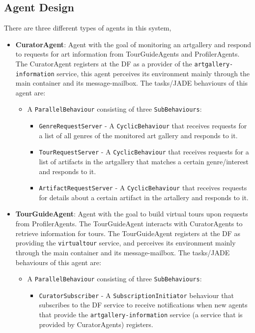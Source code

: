\documentclass[a4paper, 11pt]{article}
\begin{document}
\subsection*{Agent Design}
There are three different types of agents in this system,
\begin{itemize}
\item \textbf{CuratorAgent}: Agent with the goal of monitoring an artgallery and respond to requests for art information from TourGuideAgents and ProfilerAgents. The CuratorAgent registers at the DF as a provider of the \texttt{artgallery-information} service, this agent perceives its environment mainly through the main container and its message-mailbox. The tasks/JADE behaviours of this agent are:
\begin{itemize}
\item A \texttt{ParallelBehaviour} consisting of three \texttt{SubBehaviours}:
\begin{itemize}
\item \texttt{GenreRequestServer} - A \texttt{CyclicBehaviour} that receives requests for a list of all genres of the monitored art gallery and responds to it.
\item \texttt{TourRequestServer} - A \texttt{CyclicBehaviour} that receives requests for a list of artifacts in the artgallery that matches a certain genre/interest and responds to it.
\item \texttt{ArtifactRequestServer} - A \texttt{CyclicBehaviour} that receives requests for details about a certain artifact in the artallery and responds to it.
\end{itemize}
\end{itemize}
\item \textbf{TourGuideAgent}: Agent with the goal to build virtual tours upon requests from ProfilerAgents. The TourGuideAgent interacts with CuratorAgents to retrieve information for tours. The TourGuideAgent registers at the DF as providing the \texttt{virtualtour} service, and perceives its environment mainly through the main container and its message-mailbox. The tasks/JADE behaviours of this agent are:
\begin{itemize}
\item A \texttt{ParallelBehaviour} consisting of three \texttt{SubBehaviours}:
\begin{itemize}
\item \texttt{CuratorSubscriber} - A \texttt{SubscriptionInitiator} behaviour that subscribes to the DF service to receive notifications when new agents that provide the \texttt{artgallery-information} service (a service that is provided by CuratorAgents) registers.

\end{itemize}
\end{itemize}
\end{itemize}
\end{document}
